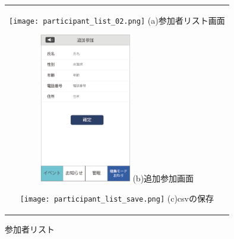 \begin{figure}[htbp]
  \begin{center}
    \begin{tabular}{c}

      \begin{minipage}{0.33\hsize}
        \begin{center}
\texttt{[image: participant\_list\_02.png]}
          \hspace{1cm} %
          {\footnotesize (a)参加者リスト画面}
        \end{center}
      \end{minipage}

      \begin{minipage}{0.33\hsize}
        \begin{center}
\includegraphics[width=4cm]{participant_add.png}
          \hspace{1cm}%
          {\footnotesize (b)追加参加画面}
        \end{center}
      \end{minipage}

      \begin{minipage}{0.33\hsize}
        \begin{center}
\texttt{[image: participant\_list\_save.png]}
          \hspace{1cm}%
          {\footnotesize (c)csvの保存}
        \end{center}
      \end{minipage}

    \end{tabular}
    \caption{参加者リスト}
    \label{tab:joinedlist}
  \end{center}
\end{figure}

